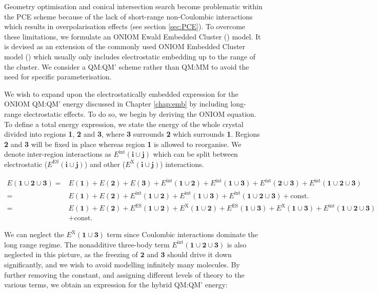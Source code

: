 Geometry optimisation and conical intersection search become problematic within the PCE scheme because of the lack of short-range non-Coulombic interactions which results in overpolarisation effects (see section \ref{sec:PCE}). To overcome these limitations, we formulate an ONIOM\cite{Chung2015} Ewald Embedded Cluster (\EEC{}) model. It is devised as an extension of the commonly used ONIOM Embedded Cluster model (\EC{}) which usually only includes electrostatic embedding up to the range of the cluster. We consider a QM:QM' scheme rather than QM:MM to avoid the need for specific parameterisation.

We wish to expand upon the electrostatically embedded expression for the ONIOM QM:QM' energy discussed in Chapter \ref{chap:emb} by including long-range electrostatic effects. To do so, we begin by deriving the ONIOM equation. To define a total energy expression, we state the energy of the whole crystal divided into regions \textbf{1}, \textbf{2} and \textbf{3}, where \textbf{3} surrounds \textbf{2} which surrounds \textbf{1}. Regions \textbf{2} and \textbf{3} will be fixed in place whereas region \textbf{1} is allowed to reorganise. We denote inter-region interactions as $E^{\text{int}}(\bm{i} \cup \bm{j})$ which can be split between electrostatic ($E^{\text{ES}}(\bm{i} \cup \bm{j})$) and other ($E^{\text{X}}(\bm{i} \cup \bm{j})$) interactions.

\begin{equation}
\begin{split}
E(\bm{1} \cup \bm{2} \cup \bm{3}) = &E(\bm{1}) + E(\bm{2}) + E(\bm{3}) + E^{\text{int}}(\bm{1} \cup \bm{2}) + E^{\text{int}}(\bm{1} \cup \bm{3}) + E^{\text{int}}(\bm{2} \cup \bm{3}) + E^{\text{int}}(\bm{1} \cup \bm{2} \cup \bm{3})\\
 = &E(\bm{1}) + E(\bm{2}) + E^{\text{int}}(\bm{1} \cup \bm{2}) + E^{\text{int}}(\bm{1} \cup \bm{3}) + E^{\text{int}}(\bm{1} \cup \bm{2} \cup \bm{3}) + \text{const.}\\
 = &E(\bm{1}) + E(\bm{2}) + E^{\text{ES}}(\bm{1} \cup \bm{2}) + E^{\text{X}}(\bm{1} \cup \bm{2}) + E^{\text{ES}}(\bm{1} \cup \bm{3}) + E^{\text{X}}(\bm{1} \cup \bm{3}) + E^{\text{int}}(\bm{1} \cup \bm{2} \cup \bm{3})\\
 &+ \text{const.}
\end{split}
\label{eq:full_ener}
\end{equation}

We can neglect the $E^{\text{X}}(\bm{1} \cup \bm{3})$ term since Coulombic interactions dominate the long range regime. The nonadditive three-body term $E^{\text{int}}(\bm{1} \cup \bm{2} \cup \bm{3})$ is also neglected in this picture, as the freezing of $\bm{2}$ and $\bm{3}$ should drive it down significantly, and we wish to avoid modelling infinitely many molecules. By further removing the constant, and assigning different levels of theory to the various terms, we obtain an expression for the hybrid QM:QM' energy:

